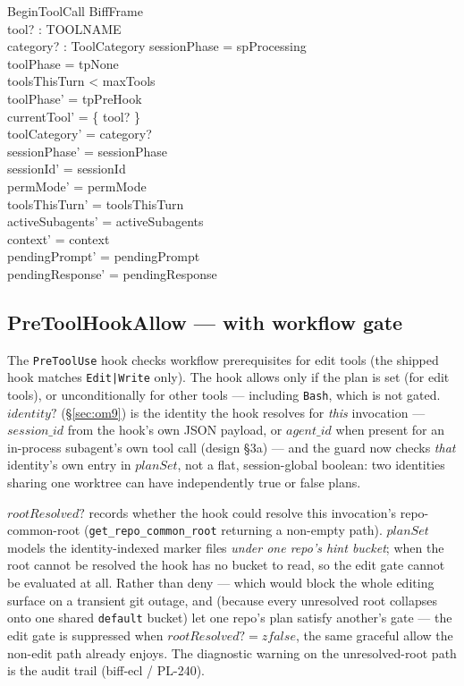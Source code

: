 \documentclass[a4paper,10pt,fleqn]{article}
\begin{document}
\begin{schema}{BeginToolCall}
  BiffFrame \\
  tool? : TOOLNAME \\
  category? : ToolCategory
  \where
  sessionPhase = spProcessing \\
  toolPhase = tpNone \\
  toolsThisTurn < maxTools \\
  toolPhase' = tpPreHook \\
  currentTool' = \{ tool? \} \\
  toolCategory' = category? \\
  sessionPhase' = sessionPhase \\
  sessionId' = sessionId \\
  permMode' = permMode \\
  toolsThisTurn' = toolsThisTurn \\
  activeSubagents' = activeSubagents \\
  context' = context \\
  pendingPrompt' = pendingPrompt \\
  pendingResponse' = pendingResponse
\end{schema}

\subsection{PreToolHookAllow --- with workflow gate}

The \texttt{PreToolUse} hook checks workflow prerequisites for
edit tools (the shipped hook matches \texttt{Edit|Write} only). The
hook allows only if the plan is set (for edit tools), or
unconditionally for other tools --- including \texttt{Bash}, which
is not gated. $identity?$ (\S\ref{sec:om9}) is the identity the hook
resolves for \emph{this} invocation --- $session\_id$ from the hook's
own JSON payload, or $agent\_id$ when present for an in-process
subagent's own tool call (design \S3a) --- and the guard now checks
\emph{that} identity's own entry in $planSet$, not a flat, session-global
boolean: two identities sharing one worktree can have independently true
or false plans.

$rootResolved?$ records whether the hook could resolve this
invocation's repo-common-root (\texttt{get\_repo\_common\_root}
returning a non-empty path). $planSet$ models the identity-indexed
marker files \emph{under one repo's hint bucket}; when the root cannot
be resolved the hook has no bucket to read, so the edit gate cannot be
evaluated at all. Rather than deny --- which would block the whole
editing surface on a transient git outage, and (because every
unresolved root collapses onto one shared \texttt{default} bucket) let
one repo's plan satisfy another's gate --- the edit gate is suppressed
when $rootResolved? = zfalse$, the same graceful allow the non-edit
path already enjoys. The diagnostic warning on the unresolved-root path
is the audit trail (biff-ecl / PL-240).
\end{document}
